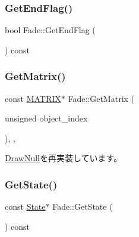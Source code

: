 \mbox{\label{class_fade_acc8adf28ce2e4270e5fb3907d83dadd0}} 
\subsubsection{\texorpdfstring{Get\+End\+Flag()}{GetEndFlag()}}
{\footnotesize\ttfamily bool Fade\+::\+Get\+End\+Flag (\begin{DoxyParamCaption}{ }\end{DoxyParamCaption}) const\hspace{0.3cm}{\ttfamily [inline]}}

\mbox{\label{class_fade_a6aed6912ebf9c243c52cb82f298d8d64}} 
\subsubsection{\texorpdfstring{Get\+Matrix()}{GetMatrix()}}
{\footnotesize\ttfamily const \mbox{\hyperlink{_vector3_d_8h_a032295cd9fb1b711757c90667278e744}{M\+A\+T\+R\+IX}}$\ast$ Fade\+::\+Get\+Matrix (\begin{DoxyParamCaption}\item[{unsigned}]{object\+\_\+index }\end{DoxyParamCaption})\hspace{0.3cm}{\ttfamily [inline]}, {\ttfamily [override]}, {\ttfamily [virtual]}}



\mbox{\hyperlink{class_draw_null_adede079e9c11a756090740b20bb43022}{Draw\+Null}}を再実装しています。

\mbox{\label{class_fade_aeb41dfcadf75dd4c980da68e243cc310}} 
\subsubsection{\texorpdfstring{Get\+State()}{GetState()}}
{\footnotesize\ttfamily const \mbox{\hyperlink{class_fade_ae77826bf3ff2ab95fb7b3b6f95cba80a}{State}}$\ast$ Fade\+::\+Get\+State (\begin{DoxyParamCaption}{ }\end{DoxyParamCaption}) const\hspace{0.3cm}{\ttfamily [inline]}}

